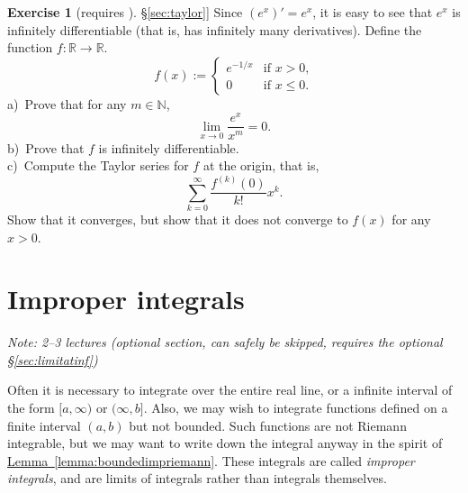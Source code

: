 \documentclass[12pt]{book}
\newcommand{\R}{{\mathbb{R}}}
\newcommand{\N}{{\mathbb{N}}}
\newcommand{\myindex}[1]{#1\index{#1}}
\newcommand{\sectionnotes}[1]{\noindent \emph{Note: #1} \medskip \par}
\newcommand{\sectionnewpage}{\clearpage}
\theoremstyle{plain}
\theoremstyle{remark}
\theoremstyle{definition}
\theoremstyle{exercise}
\newtheorem{exercise}{Exercise}[section]
\theoremstyle{example}
\newcommand{\sectionref}[1]{\hyperref[#1]{\S\ref*{#1}}}
\newcommand{\lemmaref}[1]{\hyperref[#1]{Lemma~\ref*{#1}}}
\begin{document}
\begin{exercise}[requires \sectionref{sec:taylor}]
Since $(e^x)' = e^x$, it is easy to see that $e^x$ is infinitely
differentiable (that is, has infinitely many derivatives).  Define the function $f \colon \R \to \R$.
\begin{equation*}
f(x) := \begin{cases}
e^{-1/x} & \text{if $x > 0$,} \\
0 & \text{if $x \leq 0$}.
\end{cases}
\end{equation*}
a)~Prove that for any $m \in \N$,
\begin{equation*}
\lim_{x \to 0} \frac{e^x}{x^m} = 0 .
\end{equation*}
b)~Prove that $f$ is infinitely differentiable.\\
c)~Compute the Taylor series for $f$ at the origin, that is,
\begin{equation*}
\sum_{k=0}^\infty
\frac{f^{(k)}(0)}{k!}x^k .
\end{equation*}
Show that it converges, but show that it does not converge to $f(x)$
for any $x > 0$.
\end{exercise}


\sectionnewpage
\section{Improper integrals}
\label{sec:impropriemann}

\sectionnotes{2--3 lectures (optional section, can safely be skipped, 
requires the optional \sectionref{sec:limitatinf})}

Often it is necessary to integrate over the
entire real line, or a infinite interval of the form $[a,\infty)$ or
$(\infty,b]$.  Also, we may wish to integrate functions defined on a finite
interval $(a,b)$ but not bounded.
Such functions are not Riemann integrable, but we may want to write down
the integral anyway in the spirit of \lemmaref{lemma:boundedimpriemann}.
These integrals are called \emph{\myindex{improper integrals}},
and are limits
of integrals rather than integrals themselves.
\end{document}
